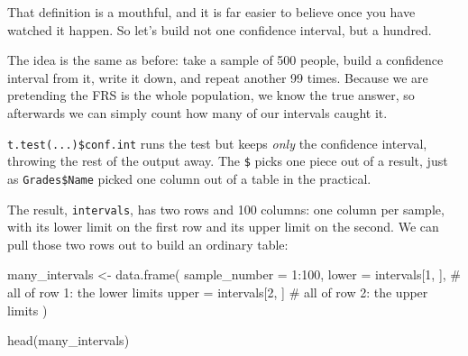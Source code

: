 \documentclass[
  letterpaper,
  DIV=11,
  numbers=noendperiod]{scrreprt}
\newenvironment{Shaded}{\begin{snugshade}}{\end{snugshade}}
\newcommand{\AttributeTok}[1]{\textcolor[rgb]{0.40,0.45,0.13}{#1}}
\newcommand{\CommentTok}[1]{\textcolor[rgb]{0.37,0.37,0.37}{#1}}
\newcommand{\DecValTok}[1]{\textcolor[rgb]{0.68,0.00,0.00}{#1}}
\newcommand{\FunctionTok}[1]{\textcolor[rgb]{0.28,0.35,0.67}{#1}}
\newcommand{\NormalTok}[1]{\textcolor[rgb]{0.00,0.23,0.31}{#1}}
\newcommand{\OtherTok}[1]{\textcolor[rgb]{0.00,0.23,0.31}{#1}}
\newcommand{\SpecialCharTok}[1]{\textcolor[rgb]{0.37,0.37,0.37}{#1}}
\begin{document}

That definition is a mouthful, and it is far easier to believe once you
have watched it happen. So let's build not one confidence interval, but
a hundred.

The idea is the same as before: take a sample of 500 people, build a
confidence interval from it, write it down, and repeat another 99 times.
Because we are pretending the FRS is the whole population, we know the
true answer, so afterwards we can simply count how many of our intervals
caught it.

\begin{Shaded}
\end{Shaded}

\texttt{t.test(...)\$conf.int} runs the test but keeps \emph{only} the
confidence interval, throwing the rest of the output away. The
\texttt{\$} picks one piece out of a result, just as
\texttt{Grades\$Name} picked one column out of a table in the practical.

The result, \texttt{intervals}, has two rows and 100 columns: one column
per sample, with its lower limit on the first row and its upper limit on
the second. We can pull those two rows out to build an ordinary table:

\begin{Shaded}
\begin{Highlighting}[]
\NormalTok{many\_intervals }\OtherTok{\textless{}{-}} \FunctionTok{data.frame}\NormalTok{(}
  \AttributeTok{sample\_number =} \DecValTok{1}\SpecialCharTok{:}\DecValTok{100}\NormalTok{,}
  \AttributeTok{lower =}\NormalTok{ intervals[}\DecValTok{1}\NormalTok{, ],   }\CommentTok{\# all of row 1: the lower limits}
  \AttributeTok{upper =}\NormalTok{ intervals[}\DecValTok{2}\NormalTok{, ]    }\CommentTok{\# all of row 2: the upper limits}
\NormalTok{)}

\FunctionTok{head}\NormalTok{(many\_intervals)}
\end{Highlighting}
\end{Shaded}
\end{document}
